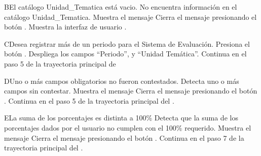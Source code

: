 
\begin{UCtrayectoriaA}{B}{El catálogo Unidad\_Tematica está vacio.}
	\UCpaso No encuentra información en el catálogo Unidad\_Tematica.
    \UCpaso Muestra el mensaje 
    \UCpaso[\UCactor] Cierra el mensaje presionando el botón .
	\UCpaso Muestra la interfaz de usuario .
\end{UCtrayectoriaA}


\begin{UCtrayectoriaA}{C}{Desea registrar más de un periodo para el Sistema de Evaluación.}
	\UCpaso[\UCactor] Presiona el botón .
	\UCpaso Despliega los campos ``Periodo'', y ``Unidad Temática''.
	\UCpaso Continua en el paso 5 de la trayectoria principal de 
\end{UCtrayectoriaA}


\begin{UCtrayectoriaA}{D}{Uno o más campos obligatorios no fueron contestados.}
	\UCpaso Detecta uno o más campos sin contestar.
    \UCpaso Muestra el mensaje 
    \UCpaso[\UCactor] Cierra el mensaje presionando el botón .
    \UCpaso Continua en el paso 5 de la trayectoria principal del .
\end{UCtrayectoriaA}



\begin{UCtrayectoriaA}{E}{La suma de los porcentajes es distinta a 100\%}
    \UCpaso Detecta que la suma de los porcentajes dados por el usuario no cumplen con el 100\% requerido.
    \UCpaso Muestra el mensaje 
    \UCpaso[\UCactor] Cierra el mensaje presionando el botón .
    \UCpaso Continua en el paso 7 de la trayectoria principal del .
\end{UCtrayectoriaA}


